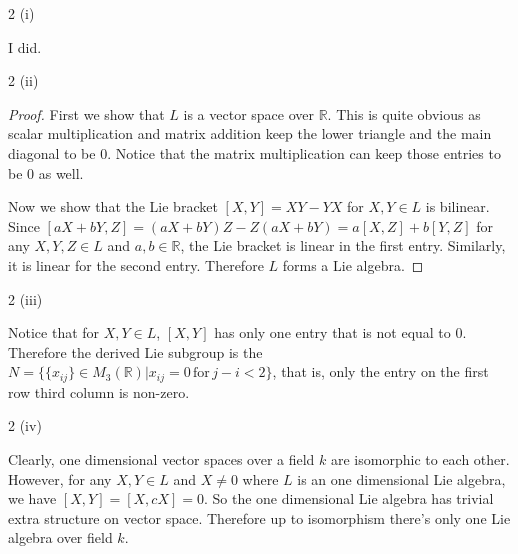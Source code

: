 \documentclass[10pt]{article}
\theoremstyle{plain}
\theoremstyle{definition}
\newenvironment{problem_hw}[1]{{\noindent\bfseries Problem #1.}}{}
\newenvironment{answer_hw}{{\noindent\em Answer.}}{}
\newcommand{\IR}{\mathbb{R}}
\newcommand{\<}{\langle}
\renewcommand{\>}{\rangle}
\begin{document}
\begin{problem_hw}{2 (i)}
\end{problem_hw}

\begin{answer_hw}
I did.\\
\end{answer_hw}

\begin{problem_hw}{2 (ii)}
\end{problem_hw}

\begin{proof} \hfill

First we show that $L$ is a vector space over $\IR$. This is quite obvious as scalar multiplication and matrix addition keep the lower triangle and the main diagonal to be 0. Notice that the matrix multiplication can keep those entries to be 0 as well.

Now we show that the Lie bracket $[X,Y] = XY-YX$ for $X,Y\in L$ is bilinear. Since $[aX+bY, Z] = (aX+bY)Z - Z(aX+bY) = a[X,Z] + b[Y,Z]$ for any $X,Y,Z\in L$ and $a,b \in \IR$, the Lie bracket is linear in the first entry. Similarly, it is linear for the second entry. Therefore $L$ forms a Lie algebra.

\end{proof}

\begin{problem_hw}{2 (iii)}
\end{problem_hw}

\begin{answer_hw}

Notice that for $X,Y\in L$, $[X,Y]$ has only one entry that is not equal to 0. Therefore the derived Lie subgroup is the $N = \{\{x_{ij}\}\in M_3(\IR)\vert x_{ij} = 0\, \mathrm{for}\, j-i <2\}$, that is, only the entry on the first row third column is non-zero. \\

\end{answer_hw}

\begin{problem_hw}{2 (iv)}
\end{problem_hw}

\begin{answer_hw}

Clearly, one dimensional vector spaces over a field $k$ are isomorphic to each other. However, for any $X, Y\in L$ and $X\not = 0$ where $L$ is an one dimensional Lie algebra, we have $[X,Y] = [X, cX] = 0$. So the one dimensional Lie algebra has trivial extra structure on vector space. Therefore up to isomorphism there's only one Lie algebra over field $k$. \\
\end{answer_hw}
\end{document}
